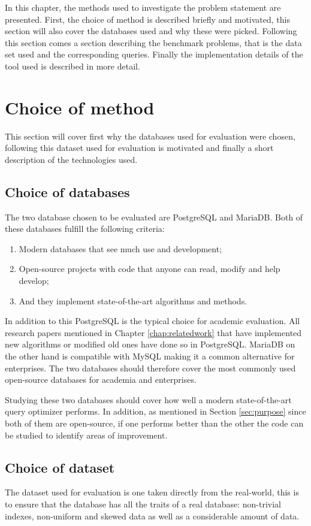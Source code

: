 In this chapter, the methods used to investigate the problem statement are
presented. First, the choice of method is described briefly and motivated, this
section will also cover the databases used and why these were picked. Following
this section comes a section describing the benchmark problems, that is the
data set used and the corresponding queries. Finally the implementation details
of the tool used is described in more detail.

\section{Choice of method} \label{sec:choiceofmethod}
This section will cover first why the databases used for evaluation were
chosen, following this dataset used for evaluation is motivated and finally a
short description of the technologies used.

\subsection{Choice of databases} \label{sec:choiceofdatabases}
The two database chosen to be evaluated are PostgreSQL and MariaDB. Both of these databases fulfill the following criteria:
\begin{enumerate}
\item Modern databases that see much use and development;
\item Open-source projects with code that anyone can read, modify and help develop;
\item And they implement state-of-the-art algorithms and methods.
\end{enumerate}

In addition to this PostgreSQL is the typical choice for academic evaluation.
All research papers mentioned in Chapter \ref{chap:relatedwork} that have
implemented new algorithms or modified old ones have done so in PostgreSQL.
MariaDB on the other hand is compatible with MySQL making it a common
alternative for enterprises. The two databases should therefore cover the most
commonly used open-source databases for academia and enterprises.

Studying these two databases should cover how well a modern state-of-the-art
query optimizer performs. In addition, as mentioned in Section \ref{sec:purpose}
since both of them are open-source, if one performs better than the other the
code can be studied to identify areas of improvement.

\subsection{Choice of dataset}
The dataset used for evaluation is one taken directly from the real-world, this
is to ensure that the database has all the traits of a real database:
non-trivial indexes, non-uniform and skewed data as well as a considerable
amount of data.

